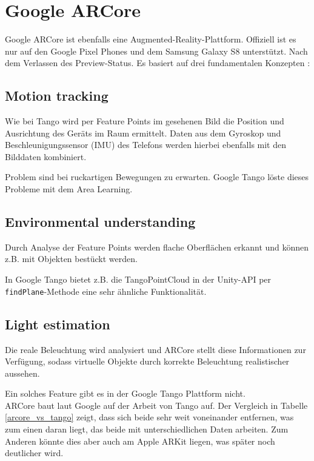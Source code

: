 
\section{Google ARCore}
Google ARCore ist ebenfalls eine Augmented-Reality-Plattform. Offiziell ist es nur auf den Google Pixel Phones und dem Samsung Galaxy S8 unterstützt. Nach dem Verlassen des Preview-Status. Es basiert auf drei fundamentalen Konzepten \cite{arcore_overview}:

\subsection{Motion tracking} Wie bei Tango wird per Feature Points im gesehenen Bild die Position und Ausrichtung des Geräts im Raum ermittelt. Daten aus dem Gyroskop und Beschleunigungssensor (IMU) des Telefons werden hierbei ebenfalls mit den Bilddaten kombiniert. \cite{arcore_fundamentals}\par
Problem sind bei ruckartigen Bewegungen zu erwarten. Google Tango löste dieses Probleme mit dem Area Learning.

\subsection{Environmental understanding} Durch Analyse der Feature Points werden flache Oberflächen erkannt und können z.B. mit Objekten bestückt werden. \cite{arcore_fundamentals}\par
In Google Tango bietet z.B. die TangoPointCloud in der Unity-API per \texttt{findPlane}-Methode eine sehr ähnliche Funktionalität.

\subsection{Light estimation} Die reale Beleuchtung wird analysiert und ARCore stellt diese Informationen zur Verfügung, sodass virtuelle Objekte durch korrekte Beleuchtung realistischer aussehen. \cite{arcore_fundamentals}\par
Ein solches Feature gibt es in der Google Tango Plattform nicht.\\

ARCore baut laut Google auf der Arbeit von Tango auf. Der Vergleich in Tabelle \ref{arcore_vs_tango} zeigt, dass sich beide sehr weit voneinander entfernen, was zum einen daran liegt, das beide mit unterschiedlichen Daten arbeiten. Zum Anderen könnte dies aber auch am Apple ARKit liegen, was später noch deutlicher wird.

